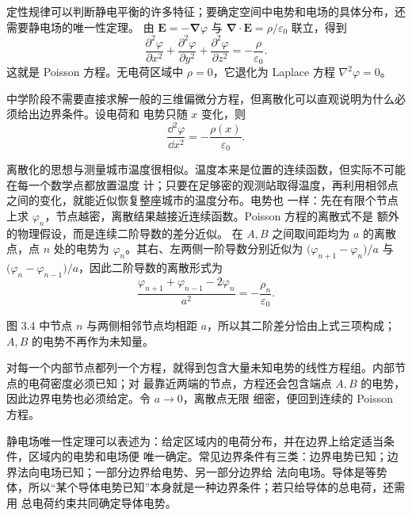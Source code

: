 定性规律可以判断静电平衡的许多特征；要确定空间中电势和电场的具体分布，还需要静电场的唯一性定理。
由
$\boldsymbol E=-\boldsymbol\nabla\varphi$ 与 $\boldsymbol\nabla\cdot\boldsymbol E=\rho/\varepsilon_0$
联立，得到
\begin{equation}
  \boxed{\frac{\partial^2\varphi}{\partial x^2}
  +\frac{\partial^2\varphi}{\partial y^2}
  +\frac{\partial^2\varphi}{\partial z^2}
  =-\frac{\rho}{\varepsilon_0}}.
\end{equation}
这就是 Poisson 方程。无电荷区域中 $\rho=0$，它退化为 Laplace 方程
$\nabla^2\varphi=0$。

中学阶段不需要直接求解一般的三维偏微分方程，但离散化可以直观说明为什么必须给出边界条件。设电荷和
电势只随 $x$ 变化，则
\begin{equation}
  \boxed{\frac{\dd^2\varphi}{\dd x^2}=-\frac{\rho(x)}{\varepsilon_0}}.
\end{equation}

离散化的思想与测量城市温度很相似。温度本来是位置的连续函数，但实际不可能在每一个数学点都放置温度
计；只要在足够密的观测站取得温度，再利用相邻点之间的变化，就能近似恢复整座城市的温度分布。电势也
一样：先在有限个节点上求 $\varphi_n$，节点越密，离散结果越接近连续函数。Poisson 方程的离散式不是
额外的物理假设，而是连续二阶导数的差分近似。
在 $A,B$ 之间取间距均为 $a$ 的离散点，点 $n$ 处的电势为 $\varphi_n$。其右、左两侧一阶导数分别近似为
$\bigl(\varphi_{n+1}-\varphi_n\bigr)/a$ 与
$\bigl(\varphi_n-\varphi_{n-1}\bigr)/a$，因此二阶导数的离散形式为
\begin{equation}
  \boxed{\frac{\varphi_{n+1}+\varphi_{n-1}-2\varphi_n}{a^2}
  =-\frac{\rho_n}{\varepsilon_0}}.
\end{equation}

图 3.4 中节点 $n$ 与两侧相邻节点均相距 $a$，所以其二阶差分恰由上式三项构成；$A,B$ 的电势不再作为未知量。

\discretePotentialFigure
{}

对每一个内部节点都列一个方程，就得到包含大量未知电势的线性方程组。内部节点的电荷密度必须已知；对
最靠近两端的节点，方程还会包含端点 $A,B$ 的电势，因此边界电势也必须给定。令 $a\to0$，离散点无限
细密，便回到连续的 Poisson 方程。

静电场唯一性定理可以表述为：给定区域内的电荷分布，并在边界上给定适当条件，区域内的电势和电场便
唯一确定。常见边界条件有三类：边界电势已知；边界法向电场已知；一部分边界给电势、另一部分边界给
法向电场。导体是等势体，所以“某个导体电势已知”本身就是一种边界条件；若只给导体的总电荷，还需用
总电荷约束共同确定导体电势。

